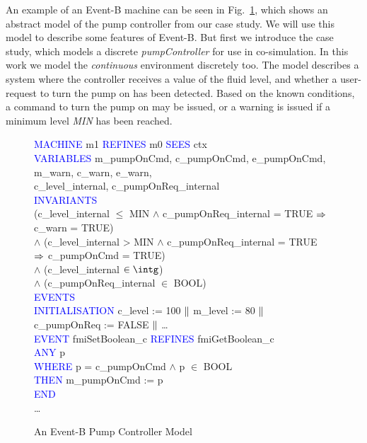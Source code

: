 \documentclass{llncs}%
\begin{document}
An example of an Event-B machine can be seen in Fig.~\ref{fig:controllerSpec2}, which shows an abstract model of the pump controller from our case study. We will use this model to describe some features of Event-B. But first we introduce the case study, which models a discrete \emph{pumpController} for use in co-simulation. In this work we model the \emph{continuous} environment discretely too. The model describes a system where the controller receives a value of the fluid level, and whether a user-request to turn the pump on has been detected. Based on the known conditions, a command to turn the pump on may be issued, or a warning is issued if a minimum level \emph{MIN} has been reached.    
%
%
\begin{figure}
\centering
\begin{minipage}{0.85\textwidth}
\textcolor{blue}{MACHINE} m1 \textcolor{blue}{REFINES} m0 \textcolor{blue}{SEES} ctx \\
\textcolor{blue}{VARIABLES}  \hspace*{0.2cm} m\_pumpOnCmd, c\_pumpOnCmd, e\_pumpOnCmd, m\_warn, c\_warn, e\_warn,\\
\hspace*{0.2cm} c\_level\_internal, c\_pumpOnReq\_internal\\
\textcolor{blue}{INVARIANTS}\\
\hspace*{0.2cm}(c\_level\_internal $\leq$ MIN $\land$  c\_pumpOnReq\_internal = TRUE $\mathbin\Rightarrow$  c\_warn = TRUE)\\
\hspace*{0.2cm} $\land$ (c\_level\_internal >  MIN $\land$  c\_pumpOnReq\_internal = TRUE\\
\hspace*{0.5cm} $\mathbin\Rightarrow$  c\_pumpOnCmd = TRUE)\\
\hspace*{0.2cm} $\land$ (c\_level\_internal $\in  \intg$)\\
\hspace*{0.2cm} $\land$ (c\_pumpOnReq\_internal $\in$  BOOL)\\
\textcolor{blue}{EVENTS}\\
\textcolor{blue}{INITIALISATION} c\_level :=  100 $\mathbin\|$ m\_level := 80 $\mathbin\|$ c\_pumpOnReq :=  FALSE $\mathbin\|$ \ldots\\
\textcolor{blue}{EVENT} fmiSetBoolean\_c \textcolor{blue}{REFINES} fmiGetBoolean\_c\\
\hspace*{0.2cm}\textcolor{blue}{ANY} p\\
\hspace*{0.2cm}\textcolor{blue}{WHERE} p = c\_pumpOnCmd $\land$ p $\in$ BOOL  \\
\hspace*{0.2cm}\textcolor{blue}{THEN} m\_pumpOnCmd :=  p\\
\hspace*{0.2cm}\textcolor{blue}{END}\\
\ldots
\end{minipage}
\caption{An Event-B  Pump Controller Model}
\label{fig:controllerSpec2}
\end{figure}
%
%
\end{document}
